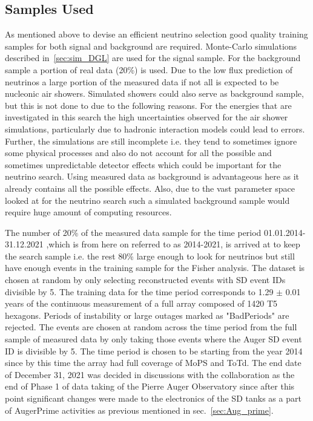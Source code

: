 \subsection{Samples Used}
\label{subsec:nu_sel_samp}
As mentioned above to devise an efficient neutrino selection good quality training samples for both signal and background are required. Monte-Carlo simulations described in~\ref{sec:sim_DGL} are used for the signal sample. For the background sample a portion of real data (20\%) is used. Due to the low flux prediction of neutrinos a large portion of the measured data if not all is expected to be nucleonic air showers. Simulated showers could also serve as background sample, but this is not done to due to the following reasons. For the energies that are investigated in this search the high uncertainties observed for the air shower simulations, particularly due to hadronic interaction models could lead to errors. Further, the simulations are still incomplete i.e. they tend to sometimes ignore some physical processes and also do not account for all the possible and sometimes unpredictable detector effects which could be important for the neutrino search. Using measured data as background is advantageous here as it already contains all the possible effects. Also, due to the vast parameter space looked at for the neutrino search such a simulated background sample would require huge amount of computing resources. 

The number of 20\% of the measured data sample for the time period 01.01.2014-31.12.2021 ,which is from here on referred to as 2014-2021, is arrived at to keep the search sample i.e. the rest 80\% large enough to look for neutrinos but still have enough events in the training sample for the Fisher analysis. The dataset is chosen at random by only selecting reconstructed events with SD event IDs divisible by 5. The training data for the time period corresponds to 1.29 $\pm$ 0.01 years of the continuous measurement of a full array composed of 1420 T5 hexagons. Periods of instability or large outages marked as "BadPeriods" are rejected. The events are chosen at random across the time period from the full sample of measured data by only taking those events where the Auger SD event ID is divisible by 5. The time period is chosen to be starting from the year 2014 since by this time the array had full coverage of MoPS and ToTd. The end date of December 31, 2021 was decided in discussions with the collaboration as the end of Phase 1 of data taking of the Pierre Auger Observatory since after this point significant changes were made to the electronics of the SD tanks as a part of AugerPrime activities as previous mentioned in sec.~\ref{sec:Aug_prime}.

